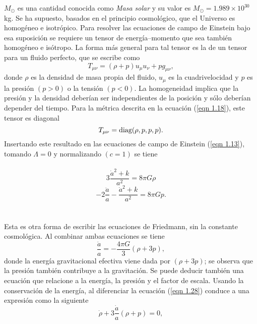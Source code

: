 \documentclass[a4paper,openright,12pt]{book}
\begin{document}
$M_{\odot}$ es una cantidad conocida como \textit{Masa solar} y su valor es $M_{\odot} = 1.989 \times 10^{30}$kg. Se ha supuesto, basados en el principio cosmológico, que el Universo es homogéneo e isotrópico. Para resolver las ecuaciones de campo de Einstein bajo esa suposición se requiere un tensor de energía--momento que sea también homogéneo e isótropo. La forma más general para tal tensor es la de un tensor para un fluido perfecto, que se escribe como \cite{1.2, 1.3}
\begin{equation}
T_{\mu \nu} =
(\rho + p)u_{\mu}u_{\nu} + pg_{\mu \nu},\label{eqn 1.26}
\end{equation}
donde $\rho$ es la densidad de masa propia del fluido, $u_{\mu}$ es la cuadrivelocidad y $p$ es la presión $(p > 0)$ o la tensión $(p < 0)$. La homogeneidad implica que la presión y la densidad deberían ser independientes de la posición y sólo deberían depender del tiempo. Para la métrica descrita en la ecuación (\ref{eqn 1.18}), este tensor es diagonal 
\begin{equation}
T_{\mu \nu} = \textup{diag}(\rho, p, p, p).\label{eqn 1.27}
\end{equation}
Insertando este resultado en las ecuaciones de campo de Einstein (\ref{eqn 1.13}), tomando $\Lambda = 0$ y normalizando $(c = 1)$ se tiene\\\\
\begin{equation*}
 3\frac{\dot{a}^{2} + k}{a^{2}}  = 8 \pi G \rho
 \end{equation*}
\begin{equation} 
-2\frac{\ddot{a}}{a} - \frac{\dot{a}^{2} + k}{a^{2}}= 8 \pi G p.\label{eqn 1.28}
\end{equation}\\\\
Esta es otra forma de escribir las ecuaciones de Friedmann, sin la constante cosmológica. Al combinar ambas ecuaciones se tiene
\begin{equation}
\frac{\ddot{a}}{a} = -\frac{4 \pi G}{3}(\rho + 3p), \label{eqn 1.29}
\end{equation}
donde la energía gravitacional efectiva viene dada por $(\rho + 3p)$; se observa que la presión también contribuye a la gravitación. Se puede deducir también una ecuación que relacione a la energía, la presión y el factor de escala. Usando la conservación de la energía, al diferenciar la ecuación (\ref{eqn 1.28}) conduce a una expresión como la siguiente
\begin{equation}
\dot{\rho} + 3\frac{\dot{a}}{a}(\rho + p) = 0,\label{eqn 1.30}
\end{equation}
\end{document}
